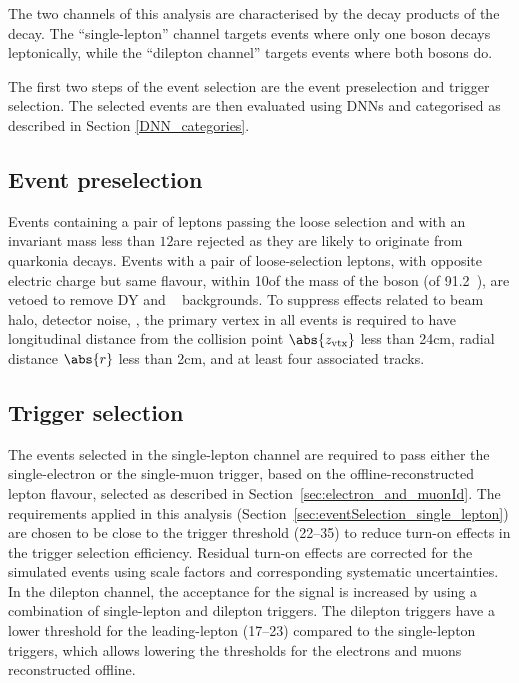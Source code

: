 The two channels of this analysis are characterised by the decay products of the \HWW decay. The ``single-lepton'' channel targets events where only one \PW boson decays leptonically, while the  ``dilepton channel'' targets events where both \PW bosons do.

The first two steps of the event selection are the event preselection and trigger selection. The selected events are then evaluated using DNNs and categorised as described in Section \ref{DNN_categories}.

\subsection{Event preselection}
\label{sec:eventSelection_cleaning}
Events containing a pair of leptons passing the loose selection and with an invariant mass less than $12$\GeV are rejected as they are likely to originate from quarkonia decays. Events with a pair of loose-selection leptons, with opposite electric charge but same flavour, within 10\GeV of the mass of the \PZ boson (of 91.2\GeV~\cite{PDG}), are vetoed to remove DY and \ttZ~ backgrounds. To suppress effects related to beam halo, detector noise, \etc, the primary vertex in all events is required to have longitudinal distance from the collision point  $\abs{z_{\mathrm{vtx}}}$ less than 24\unit{cm}, radial distance $\abs{r}$ less than 2\unit{cm}, and at least four associated tracks.

\subsection{Trigger selection}
\label{sec:eventSelection_triggers}

The events selected in the single-lepton channel are required to pass either the single-electron or the single-muon trigger, based on the offline-reconstructed lepton flavour, selected as described in Section~\ref{sec:electron_and_muonId}. The \pt requirements applied in this analysis (Section~\ref{sec:eventSelection_single_lepton}) are chosen to be close to the trigger threshold (22--35\GeV) to reduce turn-on effects in the trigger selection efficiency. Residual turn-on effects are corrected for the simulated events using scale factors and corresponding systematic uncertainties.
In the dilepton channel, the acceptance for the \HH signal is increased by using a combination of single-lepton and dilepton triggers.
The dilepton triggers have a lower \pt threshold for the leading-\pt lepton (17--23\GeV) compared to the single-lepton triggers, which allows lowering the \pt thresholds for the electrons and muons reconstructed offline.



